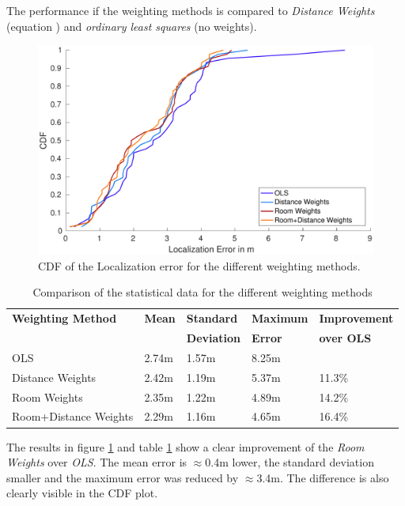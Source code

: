 The performance if the weighting methods is compared to \emph{Distance Weights} (equation ) and \emph{ordinary least squares} (no weights).

\begin{figure}[htp]
\centering
\includegraphics[width=\textwidth]{Figures/WeightingResultsCDF}
\decoRule
\caption[Weighting method comparison]{CDF of the Localization error for the different weighting methods.}
\label{fig:WeightingResultsCDF}
\end{figure}

\begin{table}
\centering
\begin{tabular}{l l l l l}
\toprule
\textbf{Weighting Method}&\textbf{Mean}&\textbf{Standard}&\textbf{Maximum}&\textbf{Improvement}\\
&&\textbf{Deviation}&\textbf{Error}&\textbf{over OLS}\\
\midrule
OLS&2.74m&1.57m&8.25m&\\
Distance Weights&2.42m&1.19m&5.37m&11.3\%\\
Room Weights&2.35m&1.22m&4.89m&14.2\%\\
Room+Distance Weights&2.29m&1.16m&4.65m&16.4\%\\
\bottomrule
\end{tabular}
\caption[Weighting method comparison]{Comparison of the statistical data for the different weighting methods}
\label{tab:WeightingStatisticalValues}
\end{table}

The results in figure \ref{fig:WeightingResultsCDF} and table \ref{tab:WeightingStatisticalValues} show a clear improvement of the \emph{Room Weights} over \emph{OLS}. The mean error is $\approx$0.4m lower, the standard deviation smaller and the maximum error was reduced by $\approx$3.4m. The difference is also clearly visible in the CDF plot.

